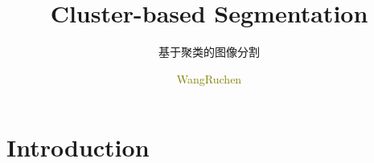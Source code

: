 \documentclass[notheorems,serif,table,compress]{beamer}  %
\begin{document}
\title{Cluster-based Segmentation }
\subtitle{基于聚类的图像分割}
\author[]{\textcolor{olive}{WangRuchen}}
\frame{ \titlepage }
\def\hilite<#1>{\temporal<#1>{\color{blue!15}}{\color{black}}{\color{black}}}
\newcommand{\shadow}[2][purple]{\hskip5pt\shadowbox{\color{#1}\small \kai #2\vspace{3mm}}}
\newcommand{\colorrbox}[2][purple]{\doublebox{\color{#1}\small \kai#2}}


\section{Introduction}
\end{document}
